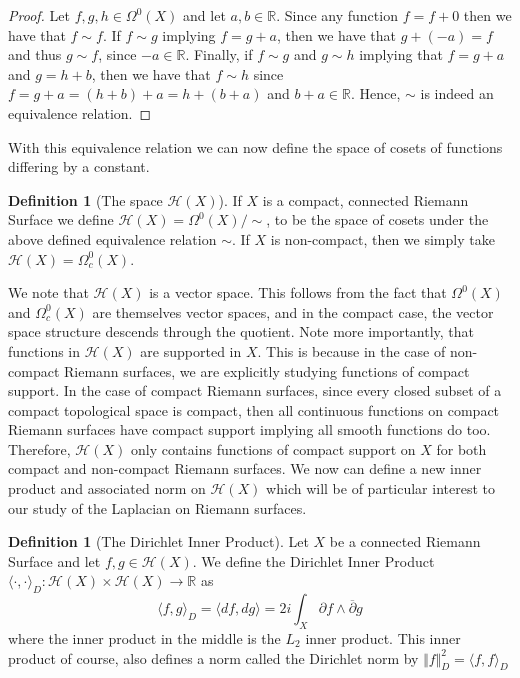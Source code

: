 \documentclass[11pt]{report}
\theoremstyle{definition}
\newtheorem{defn}[thm]{Definition}
\begin{document}
\begin{proof}
  Let $f,g,h \in \Omega^0(X)$ and let $a, b \in \mathbb{R}$. Since any function $f = f + 0$ then we have that $f \sim f$. If $f \sim g$ implying $f = g + a$, then we have that $g + (-a) = f$ and thus $g \sim f$, since $-a \in \mathbb{R}$. Finally, if $f \sim g$ and $g \sim h$ implying that $f = g + a$ and $g = h + b$, then we have that $f \sim h$ since $f = g + a = (h + b) + a = h + (b + a)$ and $b+a \in \mathbb{R}$. Hence, $\sim$ is indeed an equivalence relation. 
\end{proof}
With this equivalence relation we can now define the space of cosets of functions differing by a constant.
\begin{defn}[The space $\mathcal{H}(X)$]
  If $X$ is a compact, connected Riemann Surface we define $\mathcal{H}(X) = \Omega^0(X)/\sim$, to be the space of cosets under the above defined equivalence relation $\sim$. If $X$ is non-compact, then we simply take $\mathcal{H}(X)=\Omega_c^0(X)$.
\end{defn}

We note that $\mathcal{H}(X)$ is a vector space. This follows from the fact that $\Omega^0(X)$ and $\Omega^0_c(X)$ are themselves vector spaces, and in the compact case, the vector space structure descends through the quotient. Note more importantly, that functions in $\mathcal{H}(X)$ are supported in $X$. This is because in the case of non-compact Riemann surfaces, we are explicitly studying functions of compact support. In the case of compact Riemann surfaces, since every closed subset of a compact topological space is compact, then all continuous functions on compact Riemann surfaces have compact support implying all smooth functions do too. Therefore, $\mathcal{H}(X)$ only contains functions of compact support on $X$ for both compact and non-compact Riemann surfaces. We now can define a new inner product and associated norm on $\mathcal{H}(X)$ which will be of particular interest to our study of the Laplacian on Riemann surfaces.

\begin{defn}[The Dirichlet Inner Product]\label{dInnerProduct}
  Let $X$ be a connected Riemann Surface and let $f, g \in \mathcal{H}(X)$.
  We define the Dirichlet Inner Product $\langle \cdot, \cdot \rangle_D : \mathcal{H}(X) \times \mathcal{H}(X) \rightarrow \mathbb{R}$ as 
  \[
    \langle f, g \rangle_D =\langle df, dg \rangle = 2i \int_X \partial f \wedge \overline{\partial} g 
  \]
  where the inner product in the middle is the $L_2$ inner product.
  This inner product of course, also defines a norm called the Dirichlet norm by $\Vert f\Vert _D^2 = \langle f, f \rangle_D $
\end{defn}
\end{document}

